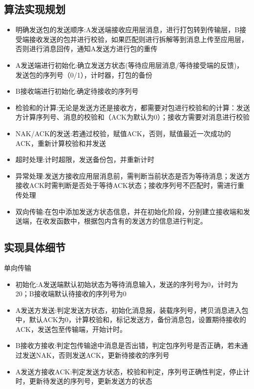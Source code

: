 \documentclass[UTF8,14pt]{article}
\numberwithin{figure}{section}
\begin{document}
\subsection{算法实现规划}
\begin{itemize}
      \setlength{\parskip}{-5mm}
      \item {明确发送包的发送顺序:\quad}A发送端接收应用层消息，进行打包转到传输层，B接受端接收发送的包并进行校验，如果匹配则进行拆解等到消息上传至应用层，否则进行消息回传，通知A发送方进行包的重传\\
      \item {A发送端进行初始化:\quad}确立发送方状态(等待应用层消息/等待接受端的反馈)，发送包的序列号（0/1），计时器，打包的备份\\
      \item {B接收端进行初始化:\quad}确定待接收的序列号\\
      \item {检验和的计算:\quad}无论是发送方还是接收方，都需要对包进行校验和的计算：发送方计算序列号、消息的校验和（ACK为默认为0）；接收方需要对消息进行校验\\
      \item {NAK/ACK的发送:\quad}若通过校验，赋值ACK，否则，赋值最近一次成功的ACK，重新计算校验和并发送\\
      \item {超时处理:\quad}计时超限，发送备份包，并重新计时\\
      \item {异常处理:\quad}发送方接收应用层消息前，需判断当前状态是否为等待消息；发送方接收ACK时需判断是否处于等待ACK状态；接收序列号不匹配时，需进行重传处理\\
      \item {双向传输:\quad}在包中添加发送方状态信息，并在初始化阶段，分别建立接收端和发送端，在收发函数中，根据包内含有的发送方的信息进行判定。
\end{itemize}
\vspace*{-0.5cm}
\subsection{实现具体细节}
单向传输
\begin{itemize}
      \setlength{\parskip}{-5mm}
      \item {初始化:\quad}A发送端默认初始状态为等待消息输入，发送的序列号为0，计时为20；B接收端默认待接收的序列号为0\\
      \item {A发送方发送:\quad}判定发送方状态，初始化消息报，装载序列号，拷贝消息进入包中，默认ACK为0，计算校验和，标记发送方，备份消息包，设置期待接收的ACK，发送包至传输端，开始计时。\\
      \item {B接收方接收:\quad}判定包传输途中消息是否出错，判定包序列号是否正确，若未通过发送NAK，否则发送ACK，更新待接收的序列号\\
      \item {A发送方接收ACK:\quad}判定发送方状态，校验和判定，序列号正确性判定，停止计时，更新待发送的序列号，更新发送方的状态\\
\end{itemize}
\vspace{-1cm}
\end{document}
